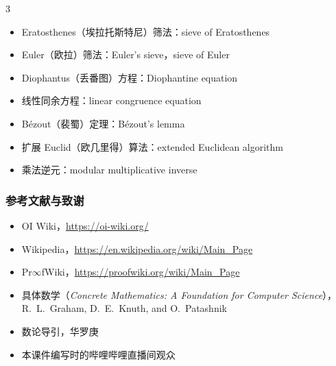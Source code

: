 \documentclass{../pkslide}
\begin{document}
\begin{frame}[c]
\begin{adjustwidth}{-.5cm}{}
\begin{mymulticols}[l][l]{3}
\begin{itemize}
        \item Eratosthenes（埃拉托斯特尼）筛法：sieve of Eratosthenes
        \item Euler（欧拉）筛法：Euler's sieve，sieve of Euler
        \item Diophantus（丢番图）方程：Diophantine equation
        \item 线性同余方程：linear congruence equation
        \item Bézout（裴蜀）定理：Bézout's lemma
        \item 扩展 Euclid（欧几里得）算法：extended Euclidean algorithm
        \item 乘法逆元：modular multiplicative inverse
      \end{itemize}
    \end{mymulticols}
  \end{adjustwidth}
\end{frame}

\begin{frame}[c]
  \frametitle{参考文献与致谢}
  \begin{itemize}
    \item OI Wiki，\url{https://oi-wiki.org/}
    \item Wikipedia，\url{https://en.wikipedia.org/wiki/Main_Page}
    \item \textsf{Pr}$\infty$\textsf{fWiki}，\url{https://proofwiki.org/wiki/Main_Page}
    \item 具体数学（\textit{Concrete Mathematics: A Foundation for Computer Science}），R.~L.~Graham, D.~E.~Knuth, and O.~Patashnik
    \item 数论导引，华罗庚
    \item 本课件编写时的哔哩哔哩直播间观众
  \end{itemize}
\end{frame}
\end{document}
